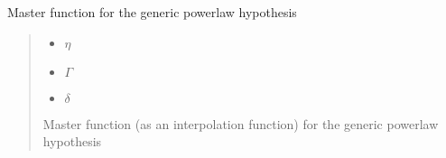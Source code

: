 \documentclass[letterpaper,10pt,english]{sphinxmanual}
\begin{document}
\begin{fulllineitems}
\label{\detokenize{diffsph.spectra:diffsph.spectra.synchrotron.Mst_pw}}
\pysigstartsignatures
{}
\pysigstopsignatures
\sphinxAtStartPar
Master function for the generic power\sphinxhyphen{}law hypothesis
\begin{quote}\begin{description}
\begin{itemize}
\item {} 
\sphinxAtStartPar
{} \textendash{} \(\eta\)

\item {} 
\sphinxAtStartPar
{} \textendash{} \(\Gamma\)

\item {} 
\sphinxAtStartPar
{} \textendash{} \(\delta\)

\end{itemize}

\sphinxAtStartPar
Master function (as an interpolation function) for the generic power\sphinxhyphen{}law hypothesis

\end{description}\end{quote}

\end{fulllineitems}

\end{document}

